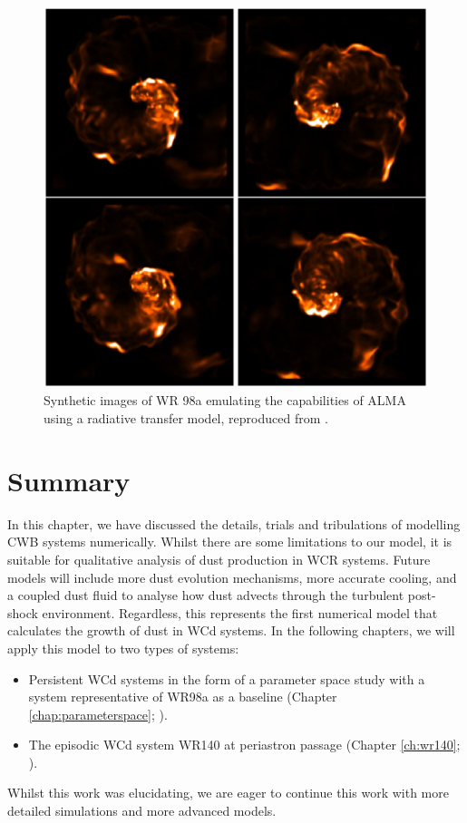 \begin{figure}[ht]
  \centering
  \includegraphics{assets/hendrix-synthetic-observation.jpeg}
  \caption[\textit{Radiative transfer images of WR98a \parencite{hendrix_pinwheels_2016}}]{Synthetic images of WR 98a emulating the capabilities of ALMA using a radiative transfer model, reproduced from \textcite{hendrix_pinwheels_2016}.}
  \label{fig:hendrix-synthetic}
\end{figure}

\section{Summary}

In this chapter, we have discussed the details, trials and tribulations of modelling CWB systems numerically.
Whilst there are some limitations to our model, it is suitable for qualitative analysis of dust production in WCR systems.
Future models will include more dust evolution mechanisms, more accurate cooling, and a coupled dust fluid to analyse how dust advects through the turbulent post-shock environment.
Regardless, this represents the first numerical model that calculates the growth of dust in WCd systems.
In the following chapters, we will apply this model to two types of systems:

\begin{itemize}
  \item Persistent WCd systems in the form of a parameter space study with a system representative of WR98a as a baseline (Chapter \ref{chap:parameterspace}; \cite{eatsonExplorationDustGrain2022}).
  \item The episodic WCd system WR140 at periastron passage (Chapter \ref{ch:wr140}; \cite{eatsonExploringDustGrowth2022}).
\end{itemize}

\noindent
Whilst this work was elucidating, we are eager to continue this work with more detailed simulations and more advanced models.